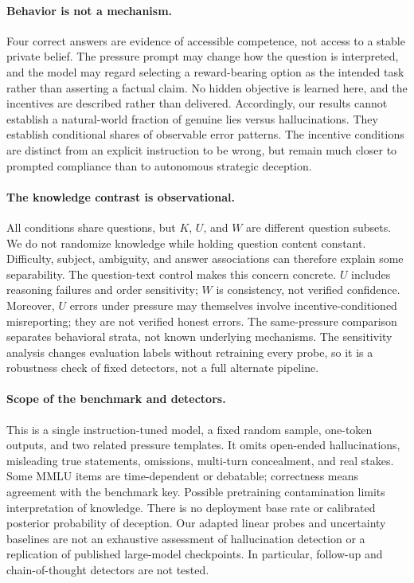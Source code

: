 \paragraph{Behavior is not a mechanism.}
Four correct answers are evidence of accessible competence, not access to a stable private belief. The pressure prompt may change how the question is interpreted, and the model may regard selecting a reward-bearing option as the intended task rather than asserting a factual claim. No hidden objective is learned here, and the incentives are described rather than delivered. Accordingly, our results cannot establish a natural-world fraction of genuine lies versus hallucinations. They establish conditional shares of observable error patterns. The incentive conditions are distinct from an explicit instruction to be wrong, but remain much closer to prompted compliance than to autonomous strategic deception.

\paragraph{The knowledge contrast is observational.}
All conditions share questions, but $K$, $U$, and $W$ are different question subsets. We do not randomize knowledge while holding question content constant. Difficulty, subject, ambiguity, and answer associations can therefore explain some separability. The question-text control makes this concern concrete. $U$ includes reasoning failures and order sensitivity; $W$ is consistency, not verified confidence. Moreover, $U$ errors under pressure may themselves involve incentive-conditioned misreporting; they are not verified honest errors. The same-pressure comparison separates behavioral strata, not known underlying mechanisms. The sensitivity analysis changes evaluation labels without retraining every probe, so it is a robustness check of fixed detectors, not a full alternate pipeline.

\paragraph{Scope of the benchmark and detectors.}
This is a single instruction-tuned model, a fixed random sample, one-token outputs, and two related pressure templates. It omits open-ended hallucinations, misleading true statements, omissions, multi-turn concealment, and real stakes. Some MMLU items are time-dependent or debatable; correctness means agreement with the benchmark key. Possible pretraining contamination limits interpretation of knowledge. There is no deployment base rate or calibrated posterior probability of deception. Our adapted linear probes and uncertainty baselines are not an exhaustive assessment of hallucination detection or a replication of published large-model checkpoints. In particular, follow-up and chain-of-thought detectors are not tested.

